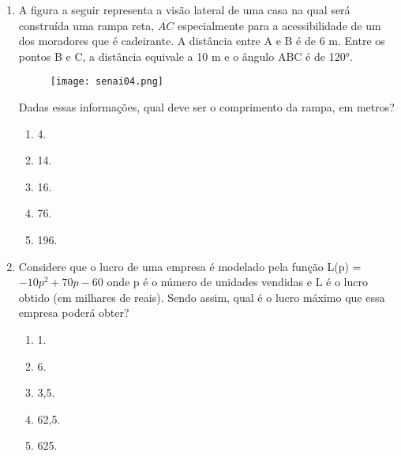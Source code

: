 \documentclass[a4paper,14pt]{article}
\begin{document}
\begin{enumerate}
    	\item A figura a seguir representa a visão lateral de uma casa na qual será construída uma rampa reta, $\overline{AC}$
    	especialmente para a acessibilidade de um dos moradores que é cadeirante. A distância entre A e B é
    	de 6 m. Entre os pontos B e C, a distância equivale a 10 m e o ângulo ABC é de 120°.
    	
    	\begin{figure}[h] %
    		\centering
    		\texttt{[image: senai04.png]} %
    	\end{figure}
    	Dadas essas informações, qual deve ser o comprimento da rampa, em metros?
    	\newline
    	\newline
    	\newline
	   	\begin{enumerate}
    		\item 4.
    		\item 14.
    		\item 16.
    		\item 76.
    		\item 196.
    	\end{enumerate}
        
        \item Considere que o lucro de uma empresa é modelado pela função
        L(p) = $-10p^2 + 70p - 60$
        onde p é o número de unidades vendidas e L é o lucro obtido (em milhares de reais).
        Sendo assim, qual é o lucro máximo que essa empresa poderá obter?
        \begin{enumerate}
        	\item 1.
        	\item 6.
        	\item 3,5.
        	\item 62,5.
        	\item 625.
        \end{enumerate}
    

\end{enumerate}
\end{document}

